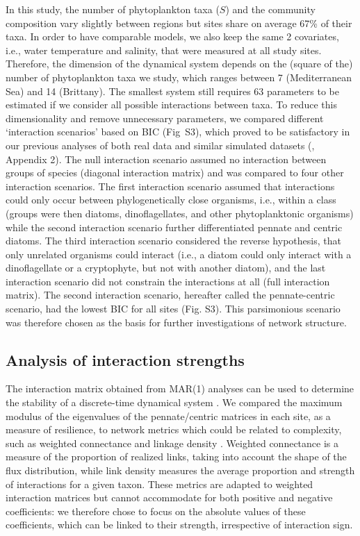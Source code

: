 \documentclass[10pt]{article}
\begin{document}
In this study, the number of phytoplankton taxa ($S$) and the community
composition vary slightly between regions but sites share on average
67\% of their taxa. In order to have comparable models, we also keep
the same 2 covariates, i.e., water temperature and salinity, that
were measured at all study sites. Therefore, the dimension of the
dynamical system depends on the (square of the) number of phytoplankton
taxa we study, which ranges between 7 (Mediterranean Sea) and 14 (Brittany).
The smallest system still requires 63 parameters to be estimated if
we consider all possible interactions between taxa. To reduce this
dimensionality and remove unnecessary parameters, we compared different
`interaction scenarios' based on BIC (Fig~S3), which proved to be
satisfactory in our previous analyses of both real data and similar
simulated datasets (\citealp{barraquand_coastal_2018}, Appendix 2). The null interaction
scenario assumed no interaction between groups of species (diagonal
interaction matrix) and was compared to four other interaction scenarios.
The first interaction scenario assumed that interactions could only
occur between phylogenetically close organisms, i.e., within a class
(groups were then diatoms, dinoflagellates, and other phytoplanktonic
organisms) while the second interaction scenario further differentiated
pennate and centric diatoms. The third interaction scenario considered
the reverse hypothesis, that only unrelated organisms could interact
(i.e., a diatom could only interact with a dinoflagellate or a cryptophyte,
but not with another diatom), and the last interaction scenario did
not constrain the interactions at all (full interaction matrix). The
second interaction scenario, hereafter called the pennate-centric
scenario, had the lowest BIC for all sites (Fig. S3). This parsimonious
scenario was therefore chosen as the basis for further investigations
of network structure.

\subsection*{Analysis of interaction strengths}

The interaction matrix obtained from MAR(1) analyses can be used to
determine the stability of a discrete-time dynamical system \citep{ives_estimating_2003}.
We compared the maximum modulus of the eigenvalues of the pennate/centric
matrices in each site, as a measure of resilience, to network metrics
which could be related to complexity, such as weighted connectance
and linkage density \citep{bersier_quantitative_2002}. Weighted connectance
is a measure of the proportion of realized links, taking into account
the shape of the flux distribution, while link density measures the
average proportion and strength of interactions for a given taxon.
These metrics are adapted to weighted interaction matrices but cannot
accommodate for both positive and negative coefficients: we therefore
chose to focus on the absolute values of these coefficients, which
can be linked to their strength, irrespective of interaction sign.
\end{document}
